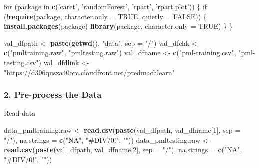 \documentclass[]{article}
\newenvironment{Shaded}{\begin{snugshade}}{\end{snugshade}}
\newcommand{\KeywordTok}[1]{\textcolor[rgb]{0.13,0.29,0.53}{\textbf{{#1}}}}
\newcommand{\DataTypeTok}[1]{\textcolor[rgb]{0.13,0.29,0.53}{{#1}}}
\newcommand{\DecValTok}[1]{\textcolor[rgb]{0.00,0.00,0.81}{{#1}}}
\newcommand{\StringTok}[1]{\textcolor[rgb]{0.31,0.60,0.02}{{#1}}}
\newcommand{\OtherTok}[1]{\textcolor[rgb]{0.56,0.35,0.01}{{#1}}}
\newcommand{\NormalTok}[1]{{#1}}
\begin{document}
\begin{Shaded}
\begin{Highlighting}[]
\NormalTok{for (package in }\KeywordTok{c}\NormalTok{(}\StringTok{'caret'}\NormalTok{, }\StringTok{'randomForest'}\NormalTok{, }\StringTok{'rpart'}\NormalTok{, }\StringTok{'rpart.plot'}\NormalTok{)) \{}
  \NormalTok{if (!}\KeywordTok{require}\NormalTok{(package, }\DataTypeTok{character.only =} \OtherTok{TRUE}\NormalTok{, }\DataTypeTok{quietly =} \OtherTok{FALSE}\NormalTok{)) \{}
    \KeywordTok{install.packages}\NormalTok{(package)}
    \KeywordTok{library}\NormalTok{(package, }\DataTypeTok{character.only =} \OtherTok{TRUE}\NormalTok{)}
  \NormalTok{\}}
\NormalTok{\}}

\NormalTok{val_dfpath <-}\StringTok{ }\KeywordTok{paste}\NormalTok{(}\KeywordTok{getwd}\NormalTok{(), }\StringTok{"data"}\NormalTok{, }\DataTypeTok{sep =} \StringTok{"/"}\NormalTok{)}
\NormalTok{val_dfchk <-}\StringTok{ }\KeywordTok{c}\NormalTok{(}\StringTok{"pmltraining.raw"}\NormalTok{, }\StringTok{"pmltesting.raw"}\NormalTok{)}
\NormalTok{val_dfname <-}\StringTok{ }\KeywordTok{c}\NormalTok{(}\StringTok{"pml-training.csv"}\NormalTok{, }\StringTok{"pml-testing.csv"}\NormalTok{)}
\NormalTok{val_dfdlink <-}\StringTok{ "https://d396qusza40orc.cloudfront.net/predmachlearn"}
\end{Highlighting}
\end{Shaded}

\subsubsection{2. Pre-process the Data}\label{pre-process-the-data}

Read data

\begin{Shaded}
\begin{Highlighting}[]
\NormalTok{data_pmltraining.raw <-}\StringTok{ }\KeywordTok{read.csv}\NormalTok{(}\KeywordTok{paste}\NormalTok{(val_dfpath, val_dfname[}\DecValTok{1}\NormalTok{], }\DataTypeTok{sep =} \StringTok{"/"}\NormalTok{), }\DataTypeTok{na.strings =} \KeywordTok{c}\NormalTok{(}\StringTok{"NA"}\NormalTok{, }\StringTok{"#DIV/0!"}\NormalTok{, }\StringTok{""}\NormalTok{))}
\NormalTok{data_pmltesting.raw <-}\StringTok{ }\KeywordTok{read.csv}\NormalTok{(}\KeywordTok{paste}\NormalTok{(val_dfpath, val_dfname[}\DecValTok{2}\NormalTok{], }\DataTypeTok{sep =} \StringTok{"/"}\NormalTok{), }\DataTypeTok{na.strings =} \KeywordTok{c}\NormalTok{(}\StringTok{"NA"}\NormalTok{, }\StringTok{"#DIV/0!"}\NormalTok{, }\StringTok{""}\NormalTok{))}
\end{Highlighting}
\end{Shaded}
\end{document}
